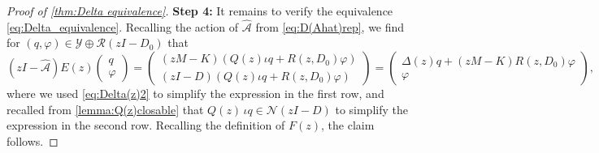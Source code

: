 \documentclass[english]{myarticle}
\begin{document}
\begin{sloppypar}
\begin{proof}[Proof of \cref{thm:Delta equivalence}]
\textbf{Step 4:} It remains to verify the equivalence \eqref{eq:Delta_equivalence}. Recalling the action of $\hat{\mathcal{A}}$ from \eqref{eq:D(Ahat)rep}, we find for $(q,\varphi) \in \mathcal{Y} \oplus \mathcal{R}(zI-D_0)$ that
\begin{equation*}
    (zI - \hat{\mathcal{A}})E(z) \begin{pmatrix}
    q \\
    \varphi
    \end{pmatrix} = 
    \begin{pmatrix}
    (zM - K)(Q(z)\iota q + R(z, D_0) \varphi) \\
    (zI - D) (Q(z) \iota q + R(z, D_0)\varphi)
\end{pmatrix} = \begin{pmatrix}
    \Delta(z)q + (zM-K)R(z,D_0)\varphi \\
    \varphi
\end{pmatrix},
\end{equation*}
where we used \eqref{eq:Delta(z)2} to simplify the expression in the first row, and recalled from \cref{lemma:Q(z)closable} that $Q(z)\,\iota q \in \mathcal{N}(zI - D)$ to simplify the expression in the second row. Recalling the definition of $F(z)$, the claim follows.
\end{proof}


\end{sloppypar}
\end{document}
